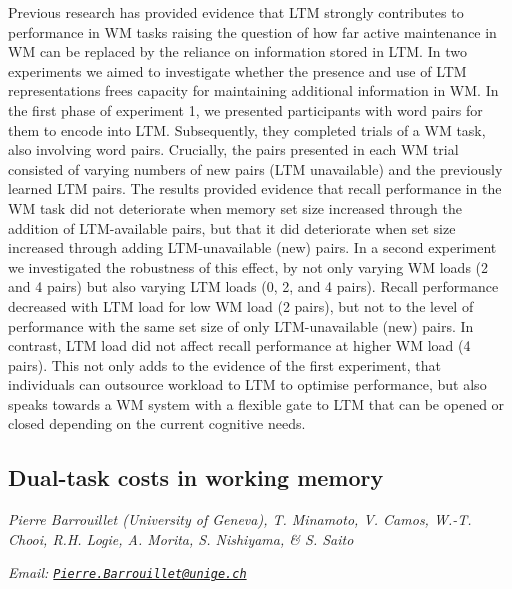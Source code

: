 \documentclass[
  12pt,
]{book}
\begin{document}
Previous research has provided evidence that LTM strongly contributes to performance in WM tasks raising the question of how far active maintenance in WM can be replaced by the reliance on information stored in LTM. In two experiments we aimed to investigate whether the presence and use of LTM representations frees capacity for maintaining additional information in WM. In the first phase of experiment 1, we presented participants with word pairs for them to encode into LTM. Subsequently, they completed trials of a WM task, also involving word pairs. Crucially, the pairs presented in each WM trial consisted of varying numbers of new pairs (LTM unavailable) and the previously learned LTM pairs. The results provided evidence that recall performance in the WM task did not deteriorate when memory set size increased through the addition of LTM-available pairs, but that it did deteriorate when set size increased through adding LTM-unavailable (new) pairs. In a second experiment we investigated the robustness of this effect, by not only varying WM loads (2 and 4 pairs) but also varying LTM loads (0, 2, and 4 pairs). Recall performance decreased with LTM load for low WM load (2 pairs), but not to the level of performance with the same set size of only LTM-unavailable (new) pairs. In contrast, LTM load did not affect recall performance at higher WM load (4 pairs). This not only adds to the evidence of the first experiment, that individuals can outsource workload to LTM to optimise performance, but also speaks towards a WM system with a flexible gate to LTM that can be opened or closed depending on the current cognitive needs.

\hypertarget{dual-task-costs-in-working-memory}{%
\subsection{Dual-task costs in working memory}\label{dual-task-costs-in-working-memory}}

\emph{Pierre Barrouillet (University of Geneva), T. Minamoto, V. Camos, W.-T. Chooi, R.H. Logie, A. Morita, S. Nishiyama, \& S. Saito}

\emph{Email: \href{mailto:Pierre.Barrouillet@unige.ch}{\nolinkurl{Pierre.Barrouillet@unige.ch}}}
\end{document}
